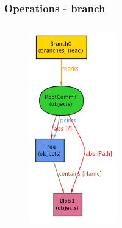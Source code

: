 \documentclass{beamer}
\begin{document}
\begin{frame}[fragile]
   \frametitle{Operations - branch}
   \begin{columns}[c]
      \column{1.5in}
      \begin{figure}
         \centering
         \includegraphics[width=0.75\textwidth]{images/branch1.png}
      \end{figure}
      \pause
      \column{1.5in}
      \begin{figure}
         \centering

\end{figure}
\end{columns}
\end{frame}
\end{document}
